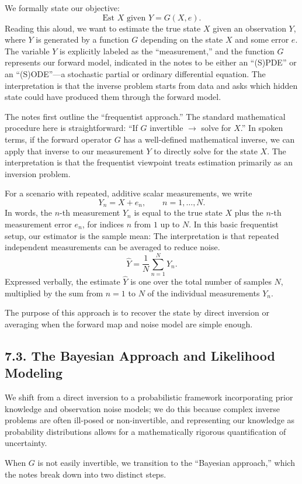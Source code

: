 \documentclass[11pt]{article}
\theoremstyle{definition}
\theoremstyle{remark}
\begin{document}
We formally state our objective:
\[
\text{Est } X \text{ given } Y=G(X,e).
\]
Reading this aloud, we want to estimate the true state $X$ given an observation $Y$, where $Y$ is generated by a function $G$ depending on the state $X$ and some error $e$. The variable $Y$ is explicitly labeled as the ``measurement,'' and the function $G$ represents our forward model, indicated in the notes to be either an ``(S)PDE'' or an ``(S)ODE''---a stochastic partial or ordinary differential equation.
The interpretation is that the inverse problem starts from data and asks which hidden state could have produced them through the forward model.

The notes first outline the ``frequentist approach.'' The standard mathematical procedure here is straightforward: ``If $G$ invertible $\to$ solve for $X$.'' In spoken terms, if the forward operator $G$ has a well-defined mathematical inverse, we can apply that inverse to our measurement $Y$ to directly solve for the state $X$.
The interpretation is that the frequentist viewpoint treats estimation primarily as an inversion problem.

For a scenario with repeated, additive scalar measurements, we write
\[
Y_n=X+e_n,\qquad n=1,\dots,N.
\]
In words, the $n$-th measurement $Y_n$ is equal to the true state $X$ plus the $n$-th measurement error $e_n$, for indices $n$ from $1$ up to $N$. In this basic frequentist setup, our estimator is the sample mean:
The interpretation is that repeated independent measurements can be averaged to reduce noise.
\[
\hat Y=\frac1N\sum_{n=1}^N Y_n.
\]
Expressed verbally, the estimate $\hat Y$ is one over the total number of samples $N$, multiplied by the sum from $n=1$ to $N$ of the individual measurements $Y_n$.

The purpose of this approach is to recover the state by direct inversion or averaging when the forward map and noise model are simple enough.

\subsection*{7.3. The Bayesian Approach and Likelihood Modeling}
We shift from a direct inversion to a probabilistic framework incorporating prior knowledge and observation noise models; we do this because complex inverse problems are often ill-posed or non-invertible, and representing our knowledge as probability distributions allows for a mathematically rigorous quantification of uncertainty.

When $G$ is not easily invertible, we transition to the ``Bayesian approach,'' which the notes break down into two distinct steps.
\end{document}
